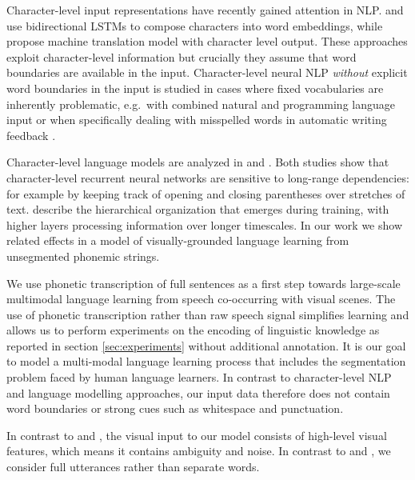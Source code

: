 Character-level input representations have recently gained attention
in NLP.  and
 use bidirectional LSTMs to compose
characters into word embeddings, while
 propose machine translation model with 
character level output. These approaches exploit character-level
information but crucially they assume that word boundaries are available
in the input.
Character-level neural NLP \textit{without} explicit word boundaries in the input is studied in cases where fixed vocabularies are inherently problematic, e.g.\ with combined natural and programming language input \cite{chrupala2013text} or when specifically dealing with misspelled words in automatic writing feedback \cite{xie2016neural}. 

Character-level language models are analyzed in
 and
. Both studies show that
character-level recurrent neural networks are sensitive to
long-range dependencies: for example by keeping track of opening and
closing parentheses over stretches of
text.  describe the hierarchical
organization that emerges during training, with higher layers
processing information over longer timescales. In our work we show
related effects in a model of visually-grounded
language learning from unsegmented phonemic strings.

We use phonetic transcription of full sentences as a first step
towards large-scale multimodal language learning from speech
co-occurring with visual scenes. 
The use of phonetic
transcription rather than raw speech signal simplifies learning
and allows us to perform experiments on the encoding of linguistic
knowledge as reported in section \ref{sec:experiments} without
additional annotation. It is our goal to model a multi-modal language learning process that includes the segmentation problem faced by human language learners. In contrast to character-level NLP and language modelling approaches, our input data therefore does not contain word boundaries or strong cues such as whitespace and punctuation.

In contrast to 
and , the visual input to our model consists
of high-level visual features, which means it contains ambiguity and
noise. In contrast to  and
, we consider full utterances rather than
separate words. 

